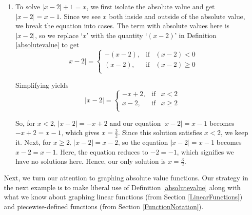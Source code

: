 {\begin{enumerate}
\item  To solve $|x-2| + 1 = x$, we first isolate the absolute value and get $|x-2| = x-1$.  Since we see $x$ both inside and outside of the absolute value, we break the equation into cases.  The term with absolute values here is $|x-2|$, so we replace `$x$' with the quantity `$(x-2)$' in Definition \ref{absolutevalue} to get \[ |x-2| = \left\{ \begin{array}{rcl} -(x-2), & \mbox{if} & (x-2) < 0  \\ (x-2), & \mbox{if} & (x-2) \geq 0 \\ \end{array} \right.\]

Simplifying yields \[ |x-2| = \left\{ \begin{array}{rcl} -x+2, & \mbox{if} & x < 2 \\ x-2, & \mbox{if} & x \geq 2 \\ \end{array} \right.\]

So, for $x<2$, $|x-2| = -x+2$ and our equation  $|x-2| = x-1$ becomes $-x+2 = x-1$, which gives $x = \frac{3}{2}$.  Since this solution satisfies $x < 2$, we keep it.  Next, for $x \geq 2$, $|x-2| = x-2$, so the equation $|x-2| = x-1$ becomes $x-2 = x-1$.  Here, the equation reduces to $-2 = -1$, which signifies we have no solutions here.  Hence, our only solution is $x = \frac{3}{2}$. 

\end{enumerate}
}

\medskip

Next, we turn our attention to graphing absolute value functions.  Our strategy in the next example is to make liberal use of Definition \ref{absolutevalue} along with what we know about graphing linear functions (from Section \ref{LinearFunctions}) and piecewise-defined functions (from Section \ref{FunctionNotation}).

\pagebreak

